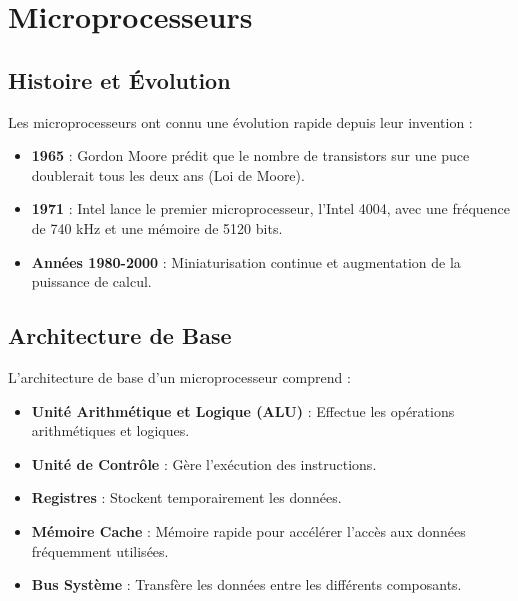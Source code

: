 \documentclass[10pt,a4paper]{article}
\begin{document}

\section*{Microprocesseurs}

\subsection*{Histoire et Évolution}

Les microprocesseurs ont connu une évolution rapide depuis leur invention :
\begin{itemize}
    \item \textbf{1965} : Gordon Moore prédit que le nombre de transistors sur une puce doublerait tous les deux ans (Loi de Moore).
    \item \textbf{1971} : Intel lance le premier microprocesseur, l'Intel 4004, avec une fréquence de 740 kHz et une mémoire de 5120 bits.
    \item \textbf{Années 1980-2000} : Miniaturisation continue et augmentation de la puissance de calcul.
\end{itemize}


\subsection*{Architecture de Base}

L'architecture de base d'un microprocesseur comprend :
\begin{itemize}
    \item \textbf{Unité Arithmétique et Logique (ALU)} : Effectue les opérations arithmétiques et logiques.
    \item \textbf{Unité de Contrôle} : Gère l'exécution des instructions.
    \item \textbf{Registres} : Stockent temporairement les données.
    \item \textbf{Mémoire Cache} : Mémoire rapide pour accélérer l'accès aux données fréquemment utilisées.
    \item \textbf{Bus Système} : Transfère les données entre les différents composants.
\end{itemize}
\end{document}
